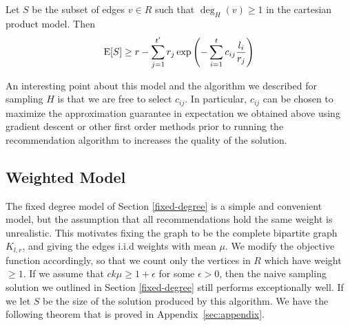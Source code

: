 \begin{thm}
Let $S$ be the subset of edges $v\in R$ such that $\deg_H(v) \geq 1$ in the cartesian product model. Then
\[ \text{E}[S] \geq r - \sum_{j=1}^{t'} r_j \exp\left(-\sum_{i=1}^t c_{ij} \frac{l_i}{r_j}\right)\]
\end{thm}
%

An interesting point about this model and the algorithm
we described for sampling $H$ is that we are free to select $c_{ij}$.
In particular, $c_{ij}$ can be chosen to maximize the
approximation guarantee in expectation we obtained above using
gradient descent or other first order methods prior to running the
recommendation algorithm to increases the quality of the solution.

\subsection{Weighted Model}
\label{weighted}
The fixed degree model of Section \ref{fixed-degree} is a simple and
convenient model, but the assumption that all recommendations hold the
same weight is unrealistic. This motivates fixing the graph to be the
complete bipartite graph $K_{l,r}$, and giving the edges i.i.d weights
with mean $\mu$. We modify the objective function accordingly, so that
we count only the vertices in $R$ which have weight $\geq 1$. If we
assume that $ck\mu \geq 1+\epsilon$ for some $\epsilon > 0$, then
the naive sampling solution we outlined in Section \ref{fixed-degree}
still performs exceptionally well. If we let $S$ be the size of the
solution produced by this algorithm. We have the following theorem that is
proved in Appendix~\ref{sec:appendix}.

